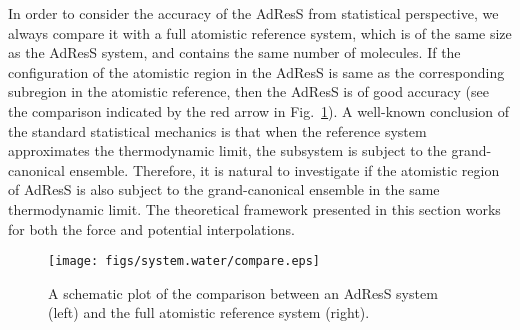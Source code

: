 \documentclass[epjST]{svjour}
\newcommand{\recheck}[1]{{\color{red} #1}}
\begin{document}
In order to consider the accuracy of the AdResS from statistical perspective, we always compare it with a full
atomistic reference system, which is of the same size as the AdResS system,
and contains the same number of molecules.
If the configuration of the atomistic region in the AdResS 
is same as the corresponding subregion in the atomistic reference, then
the AdResS  is of good accuracy (see the comparison indicated by the red arrow in Fig.~\ref{fig:compare}).
A well-known conclusion of the standard statistical mechanics is that
when the reference system approximates the thermodynamic limit, the subsystem is
subject to the grand-canonical ensemble. Therefore, it is natural to investigate
if the atomistic region of AdResS is also subject to the grand-canonical ensemble
in the same thermodynamic limit. The theoretical framework presented in this section works for
both the force and potential interpolations.

\begin{figure}
  \centering
  \texttt{[image: figs/system.water/compare.eps]}
  \caption{A schematic plot of the comparison between an AdResS system (left) and the full atomistic reference system (right).}
  \label{fig:compare}
\end{figure}
\end{document}
